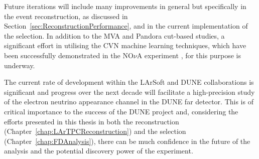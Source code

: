 Future iterations will include many improvements in general but specifically in the event reconstruction, as discussed in Section~\ref{sec:ReconstructionPerformance}, and in the current implementation of the selection.  In addition to the MVA and Pandora cut-based studies, a significant effort in utilising the CVN machine learning techniques, which have been successfully demonstrated in the NO$\nu$A experiment \cite{Aurisano2016}, for this purpose is underway.

The current rate of development within the LArSoft and DUNE collaborations is significant and progress over the next decade will facilitate a high-precision study of the electron neutrino appearance channel in the DUNE far detector.  This is of critical importance to the success of the DUNE project and, considering the efforts presented in this thesis in both the reconstruction (Chapter~\ref{chap:LArTPCReconstruction}) and the selection (Chapter~\ref{chap:FDAnalysis}), there can be much confidence in the future of the analysis and the potential discovery power of the experiment.
